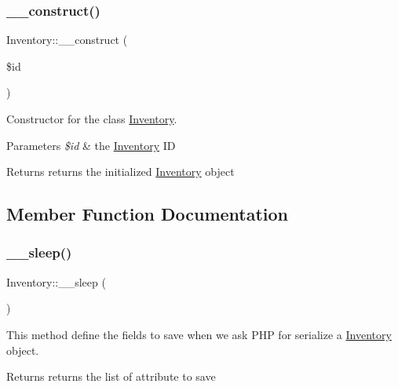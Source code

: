 \subsubsection{\texorpdfstring{\+\_\+\+\_\+construct()}{\_\_construct()}}
{\footnotesize\ttfamily Inventory\+::\+\_\+\+\_\+construct (\begin{DoxyParamCaption}\item[{}]{\$id }\end{DoxyParamCaption})}



Constructor for the class \mbox{\hyperlink{classInventory}{Inventory}}. 


\begin{DoxyParams}{Parameters}
{\em \$id} & the \mbox{\hyperlink{classInventory}{Inventory}} ID \\
\hline
\end{DoxyParams}
\begin{DoxyReturn}{Returns}
returns the initialized \mbox{\hyperlink{classInventory}{Inventory}} object 
\end{DoxyReturn}


\subsection{Member Function Documentation}
\mbox{\label{classInventory_af7c8af72b921f5d7ba545d62378b113b}} 
\subsubsection{\texorpdfstring{\+\_\+\+\_\+sleep()}{\_\_sleep()}}
{\footnotesize\ttfamily Inventory\+::\+\_\+\+\_\+sleep (\begin{DoxyParamCaption}{ }\end{DoxyParamCaption})}



This method define the fields to save when we ask P\+HP for serialize a \mbox{\hyperlink{classInventory}{Inventory}} object. 

\begin{DoxyReturn}{Returns}
returns the list of attribute to save 
\end{DoxyReturn}
\mbox{\label{classInventory_ae571fc67c0f3bb9582de755f624ba680}} 

